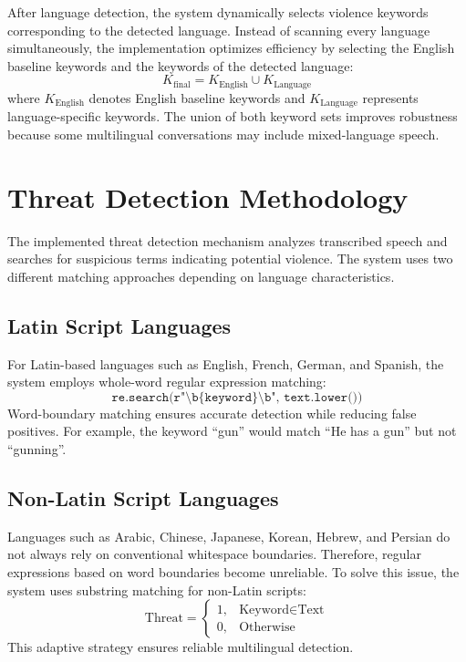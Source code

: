 \documentclass[12pt]{report}
\begin{document}
After language detection, the system dynamically selects violence keywords corresponding to the detected language. Instead of scanning every language simultaneously, the implementation optimizes efficiency by selecting the English baseline keywords and the keywords of the detected language:
\[
K_{\text{final}} = K_{\text{English}} \cup K_{\text{Language}}
\]
where $K_{\text{English}}$ denotes English baseline keywords and $K_{\text{Language}}$ represents language-specific keywords. The union of both keyword sets improves robustness because some multilingual conversations may include mixed-language speech.

\section{Threat Detection Methodology}

The implemented threat detection mechanism analyzes transcribed speech and searches for suspicious terms indicating potential violence. The system uses two different matching approaches depending on language characteristics.

\subsection{Latin Script Languages}

For Latin-based languages such as English, French, German, and Spanish, the system employs whole-word regular expression matching:
\[
\texttt{re.search(r"\textbackslash b\{keyword\}\textbackslash b", text.lower())}
\]
Word-boundary matching ensures accurate detection while reducing false positives. For example, the keyword ``gun'' would match ``He has a gun'' but not ``gunning''.

\subsection{Non-Latin Script Languages}

Languages such as Arabic, Chinese, Japanese, Korean, Hebrew, and Persian do not always rely on conventional whitespace boundaries. Therefore, regular expressions based on word boundaries become unreliable. To solve this issue, the system uses substring matching for non-Latin scripts:
\[
\text{Threat} = \begin{cases} 1, & \text{Keyword} \in \text{Text} \\ 0, & \text{Otherwise} \end{cases}
\]
This adaptive strategy ensures reliable multilingual detection.
\end{document}
